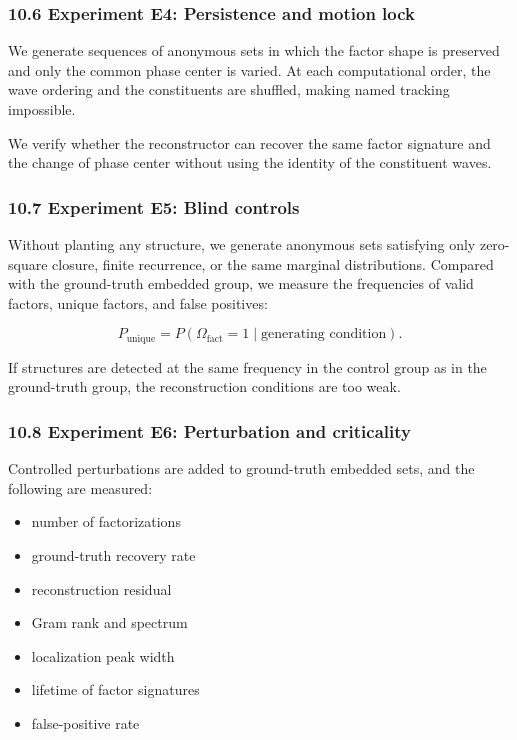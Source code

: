 \documentclass[
  a4paper,
]{article}
\providecommand{\tightlist}{%
  \setlength{\itemsep}{0pt}\setlength{\parskip}{0pt}}
\begin{document}
\subsubsection{10.6 Experiment E4: Persistence and motion
lock}\label{experiment-e4-persistence-and-motion-lock}

We generate sequences of anonymous sets in which the factor shape is
preserved and only the common phase center is varied. At each
computational order, the wave ordering and the constituents are
shuffled, making named tracking impossible.

We verify whether the reconstructor can recover the same factor
signature and the change of phase center without using the identity of
the constituent waves.

\subsubsection{10.7 Experiment E5: Blind
controls}\label{experiment-e5-blind-controls}

Without planting any structure, we generate anonymous sets satisfying
only zero-square closure, finite recurrence, or the same marginal
distributions. Compared with the ground-truth embedded group, we measure
the frequencies of valid factors, unique factors, and false positives:

\[
P_{\mathrm{unique}}
=
P\left(
\Omega_{\mathrm{fact}}=1
\mid
\text{generating condition}
\right).
\]

If structures are detected at the same frequency in the control group as
in the ground-truth group, the reconstruction conditions are too weak.

\subsubsection{10.8 Experiment E6: Perturbation and
criticality}\label{experiment-e6-perturbation-and-criticality}

Controlled perturbations are added to ground-truth embedded sets, and
the following are measured:

\begin{itemize}
\tightlist
\item
  number of factorizations
\item
  ground-truth recovery rate
\item
  reconstruction residual
\item
  Gram rank and spectrum
\item
  localization peak width
\item
  lifetime of factor signatures
\item
  false-positive rate
\end{itemize}
\end{document}
